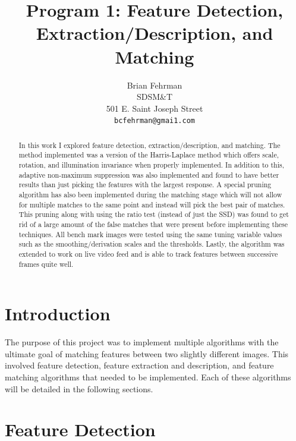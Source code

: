 \documentclass[10pt,twocolumn,letterpaper]{article}
\begin{document}
\title{ Program 1: Feature Detection, Extraction/Description, and Matching}

\author{Brian Fehrman\\
SDSM\&T\\
501 E. Saint Joseph Street\\
{\tt\small bcfehrman@gmai1.com}
\maketitle
\thispagestyle{empty}
}
\begin{abstract}
In this work I explored feature detection, extraction/description, and matching. The method implemented was a version of the Harris-Laplace method which offers scale, rotation, and illumination invariance when properly implemented. In addition to this, adaptive non-maximum suppression was also implemented and found to have better results than just picking the features with the largest response. A special pruning algorithm has also been implemented during the matching stage which will not allow for multiple matches to the same point and instead will pick the best pair of matches. This pruning along with using the ratio test (instead of just the SSD) was found to get rid of a large amount of the false matches that were present before implementing these techniques. All bench mark images were tested using the same tuning variable values such as the smoothing/derivation scales and the thresholds. Lastly, the algorithm was extended to work on live video feed and is able to track features between successive frames quite well.

\end{abstract}



\section{Introduction}
The purpose of this project was to implement multiple algorithms with the ultimate goal of matching features between two slightly different images. This involved feature detection, feature extraction and description, and feature matching algorithms that needed to be implemented. Each of these algorithms will be detailed in the following sections.

\section{Feature Detection}
\end{document}
